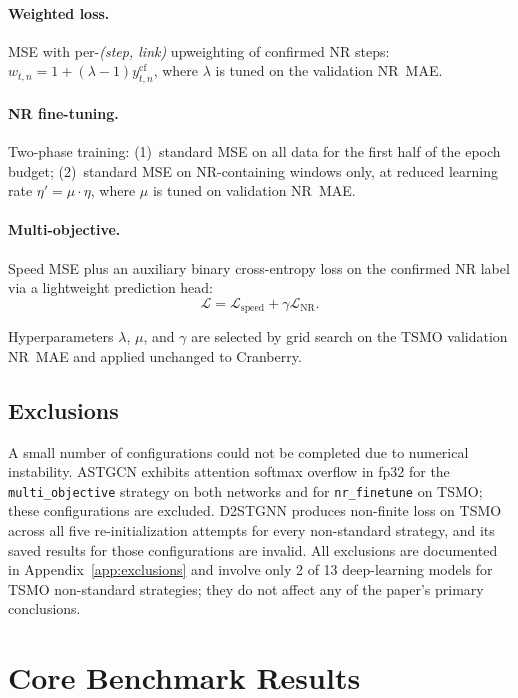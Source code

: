 \documentclass[a4paper]{cas-sc}
\newcommand{\causalfixed}{y^{\mathrm{cf}}}
\begin{document}
\paragraph{Weighted loss.}
MSE with per-\textit{(step, link)} upweighting of confirmed NR steps:
$w_{t,n} = 1 + (\lambda - 1)\causalfixed_{t,n}$,
where $\lambda$ is tuned on the validation NR~MAE.

\paragraph{NR fine-tuning.}
Two-phase training: (1)~standard MSE on all data for the first half
of the epoch budget; (2)~standard MSE on NR-containing windows only,
at reduced learning rate $\eta' = \mu \cdot \eta$, where $\mu$ is
tuned on validation NR~MAE.

\paragraph{Multi-objective.}
Speed MSE plus an auxiliary binary cross-entropy loss on the
confirmed NR label via a lightweight prediction head:
\begin{equation} \mathcal{L} = \mathcal{L}_{\text{speed}} + \gamma \mathcal{L}_{\text{NR}}. \label{eq:multi_obj} \end{equation}

Hyperparameters $\lambda$, $\mu$, and $\gamma$ are selected by grid
search on the TSMO validation NR~MAE and applied unchanged to Cranberry.

\subsection{Exclusions}
\label{sec:exclusions}

A small number of configurations could not be completed due to
numerical instability.
ASTGCN exhibits attention softmax overflow in fp32 for the
\texttt{multi\_objective} strategy on both networks and for
\texttt{nr\_finetune} on TSMO; these configurations are excluded.
D2STGNN produces non-finite loss on TSMO across all five
re-initialization attempts for every non-standard strategy, and its
saved results for those configurations are invalid.
All exclusions are documented in Appendix~\ref{app:exclusions}
and involve only 2 of 13 deep-learning models for TSMO non-standard
strategies; they do not affect any of the paper's primary conclusions.

\section{Core Benchmark Results}
\label{sec:results_core}
\end{document}
